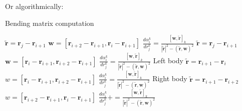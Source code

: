 Or algorithmically:
\begin{algorithm}
    \caption{Bending matrix computation}
    \label{alg:BendingAlgorithm}
    \begin{algorithmic}
                    \STATE $\mathbf{\widetilde{r}} = \mathbf{r}_j - \mathbf{r}_{i+1}$
                    \STATE $\mathbf{w} = [\mathbf{r}_{i+2} - \mathbf{r}_{i+1}, \mathbf{r}_{i} - \mathbf{r}_{i+1}]$
                    \STATE $\frac{d\alpha_i^k}{dr^k_j} = \frac{[\mathbf{w},\mathbf{\widetilde{r}}]_k}{|\mathbf{\widetilde{r}}|^2 - (\mathbf{\widetilde{r}},\mathbf{w})^2}$
                    \STATE $\mathbf{\widetilde{r}} = \mathbf{r}_j - \mathbf{r}_{i+1}$
                    \STATE $\mathbf{w} = [\mathbf{r}_{i} - \mathbf{r}_{i+1}, \mathbf{r}_{i+2} - \mathbf{r}_{i+1}]$
                    \STATE $\frac{d\alpha_i^k}{dr^k_j} = \frac{[\mathbf{w},\mathbf{\widetilde{r}}]_k}{|\mathbf{\widetilde{r}}|^2 - (\mathbf{\widetilde{r}},\mathbf{w})^2}$
                    \STATE Left body
                    \STATE $\mathbf{\widetilde{r}} = \mathbf{r}_{i+1} - \mathbf{r}_{i}$
                    \STATE $w = [\mathbf{r}_{i} - \mathbf{r}_{i+1}, \mathbf{r}_{i+2} - \mathbf{r}_{i+1}]$
                    \STATE $\frac{d\alpha_i^k}{dr^k_j} = \frac{[\mathbf{w},\mathbf{\widetilde{r}}]_k}{|\mathbf{\widetilde{r}}|^2 - (\mathbf{\widetilde{r}},\mathbf{w})^2}$
                    \STATE Right body
                    \STATE $\mathbf{\widetilde{r}} = \mathbf{r}_{i+1} - \mathbf{r}_{i+2}$
                    \STATE $w = [\mathbf{r}_{i+2} - \mathbf{r}_{i+1}, \mathbf{r}_{i} - \mathbf{r}_{i+1}]$
                    \STATE $\frac{d\alpha_i^k}{dr^k_j} += \frac{[\mathbf{w},\mathbf{\widetilde{r}}]_k}{|\mathbf{\widetilde{r}}|^2 - (\mathbf{\widetilde{r}},\mathbf{w})^2}$
                \ENDIF               
            \ENDFOR
        \ENDFOR
    \end{algorithmic}
\end{algorithm}
